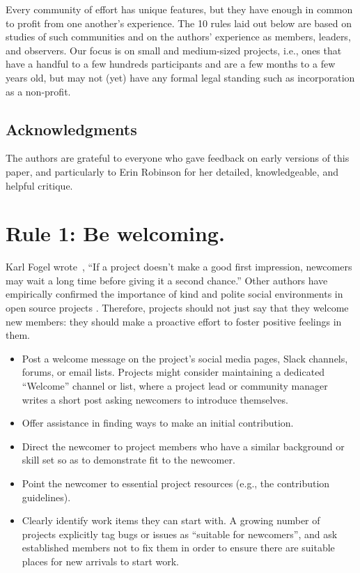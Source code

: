 \documentclass[10pt,letterpaper]{article}
\newcommand{\rulemajor}[1]{\section*{#1}}
\begin{document}
Every community of effort has unique features,
but they have enough in common to profit from one another's experience.
The 10 rules laid out below are based on studies of such communities
and on the authors' experience as members, leaders, and observers.
Our focus is on small and medium-sized projects,
i.e., ones that have a handful to a few hundreds participants
and are a few months to a few years old,
but may not (yet) have any formal legal standing
such as incorporation as a non-profit.

\subsection*{Acknowledgments}

The authors are grateful to everyone who gave feedback on early versions of this paper,
and particularly to Erin Robinson for her detailed, knowledgeable, and helpful critique.

\rulemajor{Rule 1: Be welcoming.}

Karl Fogel wrote~\cite{fogel2005},
``If a project doesn't make a good first impression, newcomers may wait a long time before giving it a second chance.''
Other authors have empirically confirmed the importance of kind and polite social environments
in open source projects \cite{singh2012,steinmacher2013,steinmacher2018a}.
Therefore, projects should not just say that they welcome new members:
they should make a proactive effort to foster positive feelings in them.

\begin{itemize}

\item
  Post a welcome message on the project's social media pages, Slack channels, forums, or email lists.
  Projects might consider maintaining a dedicated ``Welcome'' channel or list,
  where a project lead or community manager writes a short post asking newcomers to introduce themselves.

\item
  Offer assistance in finding ways to make an initial contribution.

\item
  Direct the newcomer to project members who have a similar background or skill set
  so as to demonstrate fit to the newcomer.

\item
  Point the newcomer to essential project resources (e.g., the contribution guidelines).

\item
  Clearly identify work items they can start with.
  A growing number of projects explicitly tag bugs or issues as ``suitable for newcomers'',
  and ask established members not to fix them
  in order to ensure there are suitable places for new arrivals to start work.
  
\end{itemize}
\end{document}
